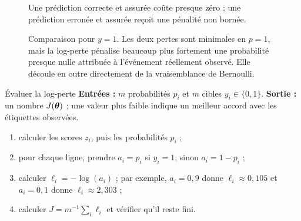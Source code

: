 \begin{figure}[htbp]
  \centering
  \caption{Une prédiction correcte et assurée coûte presque zéro ; une
  prédiction erronée et assurée reçoit une pénalité non bornée.}
  \label{fig:loss}
\end{figure}

\begin{figure}[htbp]
\centering
{}
\caption{Comparaison pour $y=1$. Les deux pertes sont minimales en $p=1$, mais
la log-perte pénalise beaucoup plus fortement une probabilité presque nulle
attribuée à l'événement réellement observé. Elle découle en outre directement
de la vraisemblance de Bernoulli.}
\label{fig:loss-comparison}
\end{figure}

\begin{procedure}{Évaluer la log-perte}
\textbf{Entrées :} $m$ probabilités $p_i$ et $m$ cibles $y_i\in\{0,1\}$.
\textbf{Sortie :} un nombre $J(\boldsymbol{\theta})$ ; une valeur plus faible indique un meilleur
accord avec les étiquettes observées.
\begin{enumerate}
  \item calculer les scores $z_i$, puis les probabilités $p_i$ ;
  \item pour chaque ligne, prendre $a_i=p_i$ si $y_i=1$, sinon $a_i=1-p_i$ ;
  \item calculer $\ell_i=-\log(a_i)$ ; par exemple, $a_i=0{,}9$ donne
        $\ell_i\approx0{,}105$ et $a_i=0{,}1$ donne $\ell_i\approx2{,}303$ ;
  \item calculer $J=m^{-1}\sum_i\ell_i$ et vérifier qu'il reste fini.
\end{enumerate}
\end{procedure}


